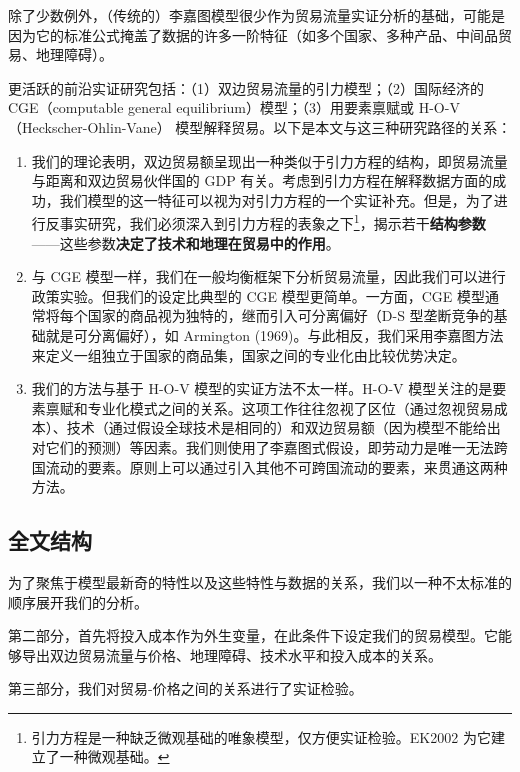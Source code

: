 \documentclass[
]{article}
\providecommand{\tightlist}{%
  \setlength{\itemsep}{0pt}\setlength{\parskip}{0pt}}
\begin{document}
除了少数例外，（传统的）李嘉图模型很少作为贸易流量实证分析的基础，可能是因为它的标准公式掩盖了数据的许多一阶特征（如多个国家、多种产品、中间品贸易、地理障碍）。

更活跃的前沿实证研究包括：（1）双边贸易流量的引力模型；（2）国际经济的
CGE（computable general equilibrium）模型；（3）用要素禀赋或
H-O-V（Heckscher-Ohlin-Vane） 模型解释贸易。以下是本文与这三种研究路径的关系：

\begin{enumerate}
\def\labelenumi{\arabic{enumi}.}
\tightlist
\item
  我们的理论表明，双边贸易额呈现出一种类似于引力方程的结构，即贸易流量与距离和双边贸易伙伴国的 GDP 有关。考虑到引力方程在解释数据方面的成功，我们模型的这一特征可以视为对引力方程的一个实证补充。但是，为了进行反事实研究，我们必须深入到引力方程的表象之下\footnote{引力方程是一种缺乏微观基础的唯象模型，仅方便实证检验。EK2002 为它建立了一种微观基础。}，揭示若干\textbf{结构参数}------这些参数\textbf{决定了技术和地理在贸易中的作用}。
\item
  与 CGE 模型一样，我们在一般均衡框架下分析贸易流量，因此我们可以进行政策实验。但我们的设定比典型的 CGE 模型更简单。一方面，CGE 模型通常将每个国家的商品视为独特的，继而引入可分离偏好（D-S 型垄断竞争的基础就是可分离偏好），如 Armington
  (1969)。与此相反，我们采用李嘉图方法来定义一组独立于国家的商品集，国家之间的专业化由比较优势决定。
\item
  我们的方法与基于 H-O-V 模型的实证方法不太一样。H-O-V 模型关注的是要素禀赋和专业化模式之间的关系。这项工作往往忽视了区位（通过忽视贸易成本）、技术（通过假设全球技术是相同的）和双边贸易额（因为模型不能给出对它们的预测）等因素。我们则使用了李嘉图式假设，即劳动力是唯一无法跨国流动的要素。原则上可以通过引入其他不可跨国流动的要素，来贯通这两种方法。
\end{enumerate}

\hypertarget{ux5168ux6587ux7ed3ux6784}{%
\subsection{全文结构}\label{ux5168ux6587ux7ed3ux6784}}

为了聚焦于模型最新奇的特性以及这些特性与数据的关系，我们以一种不太标准的顺序展开我们的分析。

第二部分，首先将投入成本作为外生变量，在此条件下设定我们的贸易模型。它能够导出双边贸易流量与价格、地理障碍、技术水平和投入成本的关系。

第三部分，我们对贸易-价格之间的关系进行了实证检验。
\end{document}
